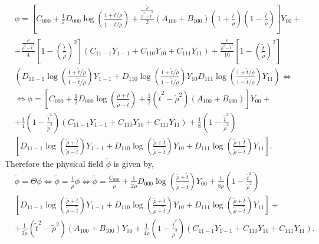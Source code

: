 \begin{align}\label{eq:phi_expansion_3}
  & \phi=\left[C_{000}+\frac{1}{2} D_{000}\log\left(\frac{1+\tilde{t}/\tilde{\rho}}{1-\tilde{t}/\tilde{\rho}}\right)+\frac{\frac{\tilde{\rho}}{\tilde{\rho}^{2}-\tilde{t}^{2}}}{2}\left(A_{100}+B_{100}\right)\left(1+\frac{\tilde{t}}{\tilde{\rho}}\right)\left(1-\frac{\tilde{t}}{\tilde{\rho}}\right)\right]Y_{00} + \nonumber \\
  & + \frac{\frac{\tilde{\rho}}{\tilde{\rho}^{2}-\tilde{t}^{2}}}{4}\left[1-\left(\frac{\tilde{t}}{\tilde{\rho}}\right)^{2}\right]\left(C_{11-1} Y_{1-1}+C_{110} Y_{10}+C_{111} Y_{11}\right) + \frac{\frac{\tilde{\rho}}{\tilde{\rho}^{2}-\tilde{t}^{2}}}{16}\left[1-\left(\frac{\tilde{t}}{\tilde{\rho}}\right)^{2}\right] \nonumber \\
  & \left(D_{11-1} \log \left(\frac{1+\tilde{t}/\tilde{\rho}}{1-\tilde{t}/\tilde{\rho}}\right) Y_{1-1}+D_{110} \log \left(\frac{1+\tilde{t} / \tilde{\rho}}{1-\tilde{t}/\tilde{\rho}}\right) Y_{10} D_{111} \log \left(\frac{1+\tilde{t} / \tilde{\rho}}{1-\tilde{t} / \tilde{\rho}}\right) Y_{11}\right) \Leftrightarrow \nonumber \\
  & \Leftrightarrow \phi=\left[C_{000}+\frac{1}{2} D_{000} \log \left(\frac{\tilde{\rho}+\tilde{t}}{\tilde{\rho}-\tilde{t}}\right)+\frac{1}{2}\left(\tilde{t}^{2}-\tilde{\rho}^{2}\right)\left(A_{100}+B_{100}\right)\right]Y_{00} + \nonumber \\
  & + \frac{1}{4}\left(1-\frac{\tilde{t}^{2}}{\tilde{p}^{2}}\right)\left(C_{11-1} Y_{1-1}+C_{110}Y_{10}+C_{111} Y_{11}\right)+\frac{1}{8}\left(1-\frac{\tilde{t}^{2}}{\tilde{\rho}^{2}}\right) \nonumber \\
  & \left[D_{11-1}\log \left(\frac{\tilde{\rho}+\tilde{t}}{\tilde{\rho}-\tilde{t}}\right)Y_{1-1}+D_{110} \log \left(\frac{\tilde{\rho}+\tilde{t}}{\tilde{\rho}-\tilde{t}}\right) Y_{10}+D_{111}\log\left(\frac{\tilde{\rho}+\tilde{t}}{\tilde{\rho}-\tilde{t}}\right) Y_{11}\right].
\end{align}
Therefore the physical field $\tilde{\phi}$ is given by,
\begin{align}\label{eq:phi_tilde}
  & \tilde{\phi}=\Theta \phi \Leftrightarrow \tilde{\phi}=\frac{1}{\tilde{\rho}} \phi \Leftrightarrow \tilde{\phi}=\frac{C_{000}}{\tilde{\rho}}+\frac{1}{2 \tilde{\rho}} D_{000} \log \left(\frac{\tilde{\rho}+\tilde{t}}{\tilde{\rho}-\tilde{t}}\right) Y_{00} + \frac{1}{8{\tilde{\rho}}}\left(1-\frac{\tilde{t}^{2}}{\tilde{\rho}^{2}}\right) \nonumber \\
  & \left[D_{11-1}\log \left(\frac{\tilde{\rho}+\tilde{t}}{\tilde{\rho}-\tilde{t}}\right) Y_{1-1}+D_{110} \log\left(\frac{\tilde{\rho}+\tilde{t}}{\tilde{\rho}-\tilde{t}}\right) Y_{10}+D_{111} \log\left(\frac{\tilde{\rho}+\tilde{t}}{\tilde{\rho}-\tilde{t}}\right)Y_{11}\right] + \nonumber \\
  & + \frac{1}{2 \tilde{\rho}}\left(\tilde{t}^{2}-\tilde{\rho}^{2}\right)\left(A_{100}+B_{100}\right) Y_{00}+\frac{1}{4 \tilde{\rho}}\left(1-\frac{\tilde{t}^{2}}{\tilde{\rho}^{2}}\right)\left(C_{11-1} Y_{1-1}+C_{110} Y_{10}+C_{111} Y_{11}\right).
\end{align}
